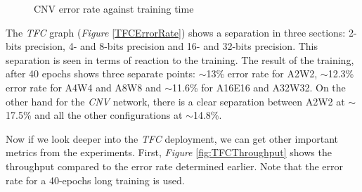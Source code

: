 \begin{figure}[htbp]
\centering
{}
\caption[CNV Error Rate]{CNV error rate against training time}
  \label{fig:CNVErrorRate}
\end{figure}

The \emph{TFC} graph (\emph{Figure} \ref{TFCErrorRate}) shows a separation in three sections: 2-bits precision, 4- and 8-bits precision and 16- and 32-bits precision. This separation is seen in terms of reaction to the training. The result of the training, after 40 epochs shows three separate points: $\sim$13\% error rate for A2W2, $\sim$12.3\% error rate for A4W4 and A8W8 and $\sim$11.6\% for A16E16 and A32W32. On the other hand for the \emph{CNV} network, there is a clear separation between A2W2 at $\sim$17.5\% and all the other configurations at $\sim$14.8\%.

Now if we look deeper into the \emph{TFC} deployment, we can get other important metrics from the experiments. First, \emph{Figure} \ref{fig:TFCThroughput} shows the throughput compared to the error rate determined earlier. Note that the error rate for a 40-epochs long training is used.

